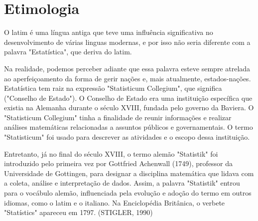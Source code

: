 \newpage
\section{Etimologia}

O latim é uma língua antiga que teve uma influência significativa no desenvolvimento de várias linguas modernas, e por isso não seria diferente com a palavra "Estatística", que deriva do latim. 
\vskip0.3cm

Na realidade, podemos perceber adiante que essa palavra esteve sempre atrelada ao aperfeiçoamento da forma de gerir nações e, mais atualmente, estados-nações. Estatística tem raiz na expressão "Statisticum Collegium", que significa  ("Conselho de Estado"). O Conselho de Estado era uma instituição específica que existia na Alemanha durante o século XVIII, fundada pelo governo da Baviera. O "Statisticum Collegium" tinha a finalidade de reunir informações e realizar análises matemáticas relacionadas a assuntos públicos e governamentais. O termo "Statisticum" foi usado para descrever as atividades e o escopo dessa instituição.\vskip0.3cm

Entretanto, já no final do século XVIII, o termo alemão "Statistik" foi introduzido pelo primeira vez por Gottfried Achenwall (1749), professor da Universidade de
Gottingen, para designar a disciplina matemática que lidava com a coleta, análise e interpretação de dados. Assim, a palavra "Statistik" entrou para o vocábulo alemão, influenciada pela evolução e adoção do termo em outros idiomas, como o latim e o italiano. Na Enciclopédia Britânica, o verbete "Statístics" apareceu em 1797. (STIGLER, 1990)

